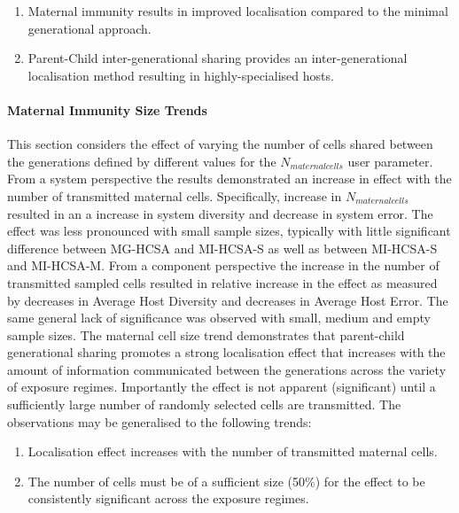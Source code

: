 \begin{enumerate}	
	\item Maternal immunity results in improved localisation compared to the minimal generational approach.
	\item Parent-Child inter-generational sharing provides an inter-generational localisation method resulting in highly-specialised hosts.
\end{enumerate}

%
%
\paragraph{Maternal Immunity Size Trends}
This section considers the effect of varying the number of cells shared between the generations defined by different values for the $N_{maternalcells}$ user parameter.
From a system perspective the results demonstrated an increase in effect with the number of transmitted maternal cells. Specifically, increase in $N_{maternalcells}$ resulted in an a increase in system diversity and decrease in system error. The effect was less pronounced with small sample sizes, typically with little significant difference between MG-HCSA and MI-HCSA-S as well as between MI-HCSA-S and MI-HCSA-M.
From a component perspective the increase in the number of transmitted sampled cells resulted in relative increase in the effect as measured by decreases in Average Host Diversity and decreases in Average Host Error. The same general lack of significance was observed with small, medium and empty sample sizes.
The maternal cell size trend demonstrates that parent-child generational sharing promotes a strong localisation effect that increases with the amount of information communicated between the generations across the variety of exposure regimes. Importantly the effect is not apparent (significant) until a sufficiently large number of randomly selected cells are transmitted. The observations may be generalised to the following trends: 

\begin{enumerate}
	\item Localisation effect increases with the number of transmitted maternal cells.
	\item The number of cells must be of a sufficient size (50\%) for the effect to be consistently significant across the exposure regimes.
\end{enumerate}

%
%
